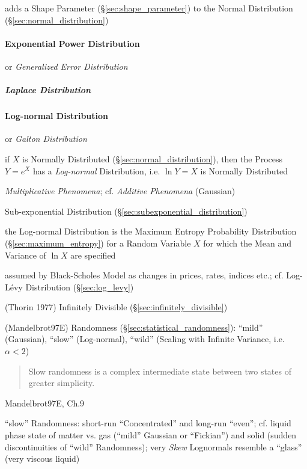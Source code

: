 adds a Shape Parameter (\S\ref{sec:shape_parameter}) to the Normal Distribution
(\S\ref{sec:normal_distribution})



\paragraph{Exponential Power Distribution}\label{sec:exponential_power}\hfill

or \emph{Generalized Error Distribution}



\subparagraph{Laplace Distribution}\label{sec:laplace_distribution}\hfill



\paragraph{Log-normal Distribution}\label{sec:lognormal_distribution}\hfill

or \emph{Galton Distribution}

if $X$ is Normally Distributed (\S\ref{sec:normal_distribution}), then the
Process $Y = e^X$ has a \emph{Log-normal} Distribution, i.e. $\ln Y = X$ is
Normally Distributed

\emph{Multiplicative Phenomena}; cf. \emph{Additive Phenomena} (Gaussian)

Sub-exponential Distribution (\S\ref{sec:subexponential_distribution})

the Log-normal Distribution is the Maximum Entropy Probability Distribution
(\S\ref{sec:maximum_entropy}) for a Random Variable $X$ for which the Mean and
Variance of $\ln X$ are specified

assumed by Black-Scholes Model as changes in prices, rates, indices etc.; cf.
Log-L\'evy Distribution (\S\ref{sec:log_levy})

(Thorin 1977) Infinitely Divisible (\S\ref{sec:infinitely_divisible})

(Mandelbrot97E) Randomness (\S\ref{sec:statistical_randomness}): ``mild''
(Gaussian), ``slow'' (Log-normal), ``wild'' (Scaling with Infinite Variance,
i.e. $\alpha < 2$)

\begin{quote}
  Slow randomness is a complex intermediate state between two states of greater
  simplicity.
\end{quote}

Mandelbrot97E, Ch.9

``slow'' Randomness: short-run ``Concentrated'' and long-run ``even''; cf.
liquid phase state of matter vs. gas (``mild'' Gaussian or ``Fickian'') and
solid (sudden discontinuities of ``wild'' Randomness);
very \emph{Skew} Lognormals resemble a ``glass'' (very viscous liquid)

